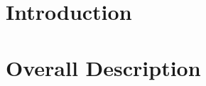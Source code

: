 \documentclass{Configuration_Files/PoliMi3i_project}
\begin{document}
    
    \tableofcontents %
    \thispagestyle{empty}
    
    
    
    \mainmatter %
    
    \clearpage
    {{\chapter{Introduction}}}
    \label{sect:introduction}
    
    
    \clearpage
    {{\chapter{Overall Description}}}
    \label{sect:overview}
    
    
\end{document}
